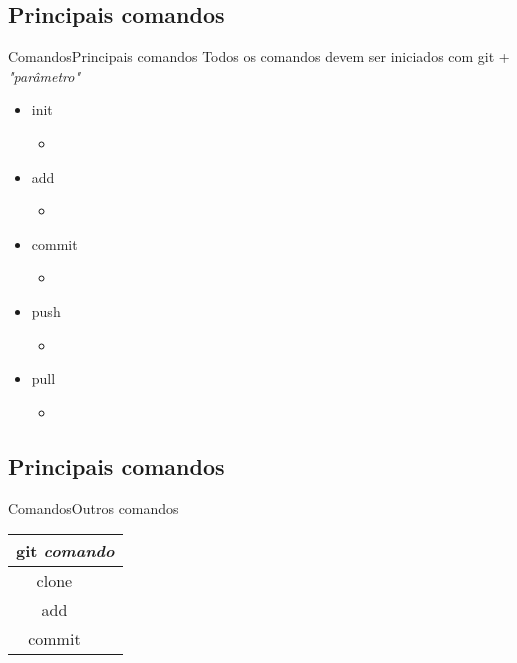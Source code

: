 \documentclass[10pt]{beamer}
\begin{document}
\subsection{Principais comandos}
\begin{frame}{Comandos}{Principais comandos}
Todos os comandos devem ser iniciados com git + \textit{"parâmetro"}
	\begin{itemize}
	\item init
		\begin{itemize}
		\item
		\end{itemize}			
	\item add
		\begin{itemize}
		\item
		\end{itemize}			
	\item commit
		\begin{itemize}
		\item
		\end{itemize}			
	\item push
		\begin{itemize}
		\item
		\end{itemize}			
	\item pull
		\begin{itemize}
		\item
		\end{itemize}
	\end{itemize}	
\end{frame}

\subsection{Principais comandos}
\begin{frame}{Comandos}{Outros comandos}
	\begin{tabular}{|c|c|}
		\hline
		\multicolumn{2}{|c|}{git \textit{comando}}\\
		\hline
		clone & \\
		\hline		
		add & \\
		\hline	
		commit & \\
		\hline	
	\end{tabular}
\end{frame}


%

{\aauwavesbg%
\begin{frame}%
\end{frame}}
\end{document}
